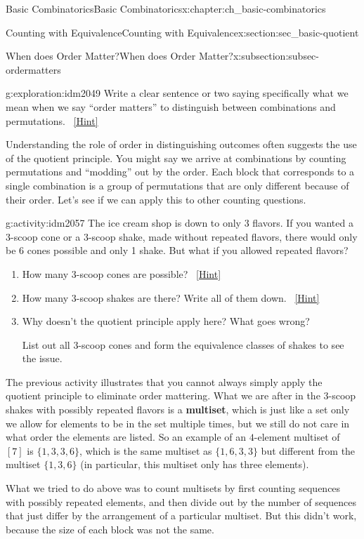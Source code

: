 \documentclass[oneside,10pt,]{book}
\newcommand{\terminology}[1]{\textbf{#1}}
\numberwithin{equation}{chapter}
\begin{document}
\begin{chapterptx}{Basic Combinatorics}{}{Basic Combinatorics}{}{}{x:chapter:ch_basic-combinatorics}
\begin{sectionptx}{Counting with Equivalence}{}{Counting with Equivalence}{}{}{x:section:sec_basic-quotient}
\begin{subsectionptx}{When does Order Matter?}{}{When does Order Matter?}{}{}{x:subsection:subsec-ordermatters}
\begin{exploration}{}{g:exploration:idm2049}
Write a clear sentence or two saying specifically what we mean when we say ``order matters'' to distinguish between combinations and permutations.%
\qquad~\hfill{\tiny\hyperlink{g:hint:idm2053-back}{[Hint]}}\end{exploration}
Understanding the role of order in distinguishing outcomes often suggests the use of the quotient principle.  You might say we arrive at combinations by counting permutations and ``modding'' out by the order.  Each block that corresponds to a single combination is a group of permutations that are only different because of their order.  Let's see if we can apply this to other counting questions.%
\begin{activity}{}{g:activity:idm2057}%
The ice cream shop is down to only 3 flavors.  If you wanted a 3-scoop cone or a 3-scoop shake, made without repeated flavors, there would only be 6 cones possible and only 1 shake.  But what if you allowed repeated flavors?%
\begin{enumerate}[font=\bfseries,label=(\alph*),ref=\alph*]
\item{}How many 3-scoop cones are possible?%
\qquad~\hfill{\tiny\hyperlink{g:hint:idm2063-back}{[Hint]}}\item{}How many 3-scoop shakes are there?  Write all of them down.%
\qquad~\hfill{\tiny\hyperlink{g:hint:idm2068-back}{[Hint]}}\item{}Why doesn't the quotient principle apply here?  What goes wrong?%
\par
List out all 3-scoop cones and form the equivalence classes of shakes to see the issue.%
\end{enumerate}
\end{activity}
The previous activity illustrates that you cannot always simply apply the quotient principle to eliminate order mattering.  What we are after in the 3-scoop shakes with possibly repeated flavors is a \terminology{multiset}, which is just like a set only we allow for elements to be in the set multiple times, but we still do not care in what order the elements are listed.  So an example of an \(4\)-element multiset of \([7]\) is \(\{1,3,3,6\}\), which is the same multiset as \(\{1,6,3,3\}\) but different from the multiset \(\{1,3,6\}\) (in particular, this multiset only has three elements).%
\par
What we tried to do above was to count multisets by first counting sequences with possibly repeated elements, and then divide out by the number of sequences that just differ by the arrangement of a particular multiset.  But this didn't work, because the size of each block was not the same.%

\end{subsectionptx}
\end{sectionptx}
\end{chapterptx}
\end{document}
